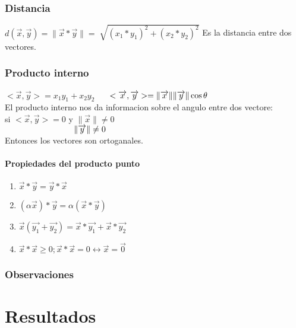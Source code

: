 \documentclass{book}
\begin{document}
\subsection*{Distancia}
$d(\overrightarrow{x},\overrightarrow{y})=\|\overrightarrow{x}*\overrightarrow{y}\|=\sqrt[]{(x_{1}*y_{1})^2+(x_{2}*y_{2})^2}$ Es la distancia entre dos vectores.
\subsection*{Producto interno}
$<\overrightarrow{x},\overrightarrow{y}>=x_{1}y_{1}+x_{2}y_{2}$
$\\\hspace*{0.4cm}<\overrightarrow{x},\overrightarrow{y}>=\|\overrightarrow{x}\|\|\overrightarrow{y}\|\cos \theta$
\\El producto interno nos da informacion sobre el angulo entre dos vectore:
\\si $<\overrightarrow{x},\overrightarrow{y}>=0$ y $\|\overrightarrow{x}\|\neq0$
\\$\hspace*{2.9cm}\|\overrightarrow{y}\|\neq0$
\\Entonces los vectores son ortoganales.
\subsubsection*{Propiedades del producto punto}
\begin{enumerate}
    \item $\overrightarrow{x}*\overrightarrow{y}=\overrightarrow{y}*\overrightarrow{x}$
    \item $(\alpha\overrightarrow{x})*\overrightarrow{y}=\alpha(\overrightarrow{x}*\overrightarrow{y})$
    \item $\overrightarrow{x}(\overrightarrow{y_{1}}+\overrightarrow{y_{2}})=\overrightarrow{x}*\overrightarrow{y_{1}}+\overrightarrow{x}*\overrightarrow{y_{2}}$
    \item $\overrightarrow{x}*\overrightarrow{x}\geq0;$$\overrightarrow{x}*\overrightarrow{x}=0\longleftrightarrow\overrightarrow{x}=\overrightarrow{0}$
\end{enumerate}
\subsection*{Observaciones}

\chapter{Resultados}
\end{document}
